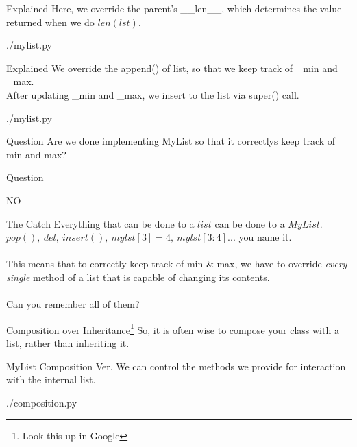 \documentclass{beamer}
\begin{document}
\begin{frame}{Explained}
  Here, we override the parent's \_\_len\_\_, which determines the value
  returned when we do $len(lst)$.
  \begin{lstinputlisting}[firstline=7, lastline=9]
    {./mylist.py}
  \end{lstinputlisting}
\end{frame}

\begin{frame}{Explained}
  We override the append() of list, so that we keep track of \_min and \_max.\\
  After updating \_min and \_max, we insert to the list via super() call.
  \begin{lstinputlisting}[firstline=11, lastline=16]
    {./mylist.py}
  \end{lstinputlisting}
\end{frame}

\begin{frame}{Question}
  Are we done implementing MyList so that it correctlys keep track of min and max?
\end{frame}

\begin{frame}{Question}
  \begin{center}
    NO
  \end{center}
\end{frame}

\begin{frame}{The Catch}
  Everything that can be done to a $list$ can be done to a $MyList$.\\
  $pop(),\ del,\ insert(),\ mylst[3]=4,\ mylst[3:4]$... you name it.\\
  \mbox{}\\
  This means that to correctly keep track of min \& max, we have to override
  \textit{every single} method of a list that is capable of changing its
  contents.\\
  \mbox{}\\
  Can you remember all of them?
\end{frame}

\begin{frame}{Composition over Inheritance\footnote{Look this up in Google}}
    So, it is often wise to compose your class with a list, rather than inheriting
    it.
\end{frame}

\begin{frame}{MyList Composition Ver.}
  We can control the methods we provide for interaction with the internal list.
  \begin{lstinputlisting}[firstline=1, lastline=23]
    {./composition.py}
  \end{lstinputlisting}
\end{frame}
\end{document}
